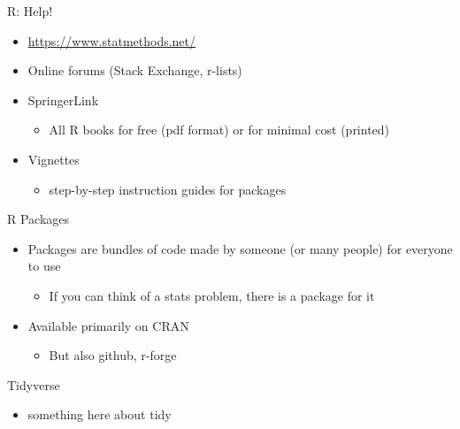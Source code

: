 \documentclass[ignorenonframetext,]{beamer}
\providecommand{\tightlist}{%
  \setlength{\itemsep}{0pt}\setlength{\parskip}{0pt}}
\begin{document}
\begin{frame}{R: Help!}
\protect\hypertarget{r-help}{}

\begin{itemize}
\tightlist
\item
  \url{https://www.statmethods.net/}
\item
  Online forums (Stack Exchange, r-lists)
\item
  SpringerLink

  \begin{itemize}
  \tightlist
  \item
    All R books for free (pdf format) or for minimal cost (printed)
  \end{itemize}
\item
  Vignettes

  \begin{itemize}
  \tightlist
  \item
    step-by-step instruction guides for packages
  \end{itemize}
\end{itemize}

\end{frame}

\begin{frame}{R Packages}
\protect\hypertarget{r-packages}{}

\begin{itemize}
\tightlist
\item
  Packages are bundles of code made by someone (or many people) for
  everyone to use

  \begin{itemize}
  \tightlist
  \item
    If you can think of a stats problem, there is a package for it
  \end{itemize}
\item
  Available primarily on CRAN

  \begin{itemize}
  \tightlist
  \item
    But also github, r-forge
  \end{itemize}
\end{itemize}

\end{frame}

\begin{frame}{Tidyverse}
\protect\hypertarget{tidyverse}{}

\begin{itemize}
\tightlist
\item
  something here about tidy
\end{itemize}

\end{frame}
\end{document}
